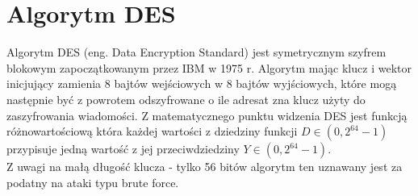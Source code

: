 \documentclass[oneside]{mgr}
\begin{document}
\section{Algorytm DES}
Algorytm DES (eng. Data Encryption Standard) jest symetrycznym szyfrem blokowym zapoczątkowanym przez IBM w 1975 r. Algorytm mając klucz i wektor inicjujący zamienia 8 bajtów wejściowych w 8 bajtów wyjściowych, które mogą następnie być z powrotem odszyfrowane o ile adresat zna klucz użyty do zaszyfrowania wiadomości. Z matematycznego punktu widzenia DES jest funkcją różnowartościową która każdej wartości z dziedziny funkcji $D \in \left( 0, 2^{64}-1 \right)$ przypisuje jedną wartość z jej przeciwdziedziny $Y \in \left( 0, 2^{64}-1 \right)$.\\
Z uwagi na małą długość klucza - tylko 56 bitów algorytm ten uznawany jest za podatny na ataki typu brute force.
\end{document}
